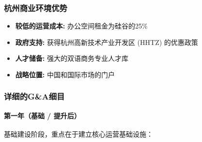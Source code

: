 \documentclass[11pt, a4paper, oneside]{article}
\begin{document}
\subsubsection{杭州商业环境优势}
\begin{itemize}
    \item \textbf{较低的运营成本:} 办公空间租金为硅谷的25\%
    \item \textbf{政府支持:}  获得杭州高新技术产业开发区 (HHTZ) 的优惠政策
    \item \textbf{人才储备:} 强大的双语商务专业人才库
    \item \textbf{战略位置:} 中国和国际市场的门户
\end{itemize}

\subsubsection{详细的G\&A细目}

\paragraph{第一年（基础 / 提升后）}
基础建设阶段，重点在于建立核心运营基础设施：
\end{document}

